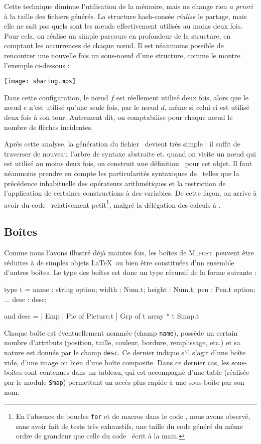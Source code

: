 \documentclass[twoside]{studia-Hermann}
\newcommand{\mlpost}{\textsc{Mlpost}}
\newcommand{\metapost}{\MP}
\begin{document}
Cette technique diminue l'utilisation de la mémoire, mais ne change rien {\em a
priori} à la taille des fichiers générés. La structure hash-consée {\em
réalise} le partage, mais elle ne sait pas quels sont les n\oe uds
effectivement 
utilisés au moins deux fois. Pour cela, on réalise un simple parcours
en profondeur de la structure, en comptant les occurrences de chaque
n\oe ud.  Il est néanmoins
possible de rencontrer une nouvelle fois un sous-n\oe ud d'une structure,
comme le montre l'exemple ci-dessous :

\begin{center}
\texttt{[image: sharing.mps]}
\end{center}

\noindent Dans cette configuration, le n\oe ud $f$ est réellement utilisé deux
fois, alors que le n\oe ud $e$ n'est utilisé qu'une seule fois, par le
n\oe ud $d$, même si celui-ci est utilisé deux fois à son tour.
Autrement dit, on comptabilise pour chaque n\oe ud le nombre de
flèches incidentes.

Après cette analyse, la génération du fichier \metapost\ devient très simple :
il suffit de traverser de nouveau l'arbre de syntaxe abstraite et,
quand on visite un n\oe ud 
qui est utilisé au moins deux fois,  on construit une définition
\metapost\ pour cet objet. Il faut néanmoins
prendre en compte les particularités syntaxiques de \metapost\ telles que la
précédence inhabituelle des opérateurs arithmétiques et la restriction de
l'application de certaines constructions à des variables. De cette façon, on
arrive à avoir du code \metapost\ relativement petit\footnote{En l'absence de
boucles \texttt{for} et de macros dans le code \metapost, nous avons observé,
sans avoir fait de tests très exhaustifs, une taille du code généré du
même ordre de grandeur que celle du code \metapost\ écrit à la main.},
malgré la délégation des calculs à \metapost. 

\subsection{Boîtes}\label{subsec:boxes}

Comme nous l'avons illustré déjà maintes fois, les boîtes de \mlpost\
peuvent être réduites à de simples objets \LaTeX\ ou bien être
constituées d'un ensemble d'autres boîtes. Le type des boîtes est donc
un type récursif de la forme suivante :
\begin{ocaml}
type t =
  { name : string option;
    width : Num.t;  height : Num.t; pen : Pen.t option; ...
    desc : desc; }
    
and desc = 
  | Emp
  | Pic of Picture.t
  | Grp of t array * t Smap.t
\end{ocaml}
Chaque boîte est éventuellement nommée (champ \texttt{name}), possède
un certain nombre d'attributs (position, taille, couleur, bordure,
remplissage, etc.) et sa nature est donnée par le champ \texttt{desc}.
Ce dernier indique s'il s'agit d'une boîte vide, d'une image ou bien
d'une boîte composite. Dans ce dernier cas, les sous-boîtes sont
contenues dans un tableau, qui est accompagné d'une table (réalisée
par le module \texttt{Smap}) permettant un accès plus rapide à une 
sous-boîte par son nom.
\end{document}
